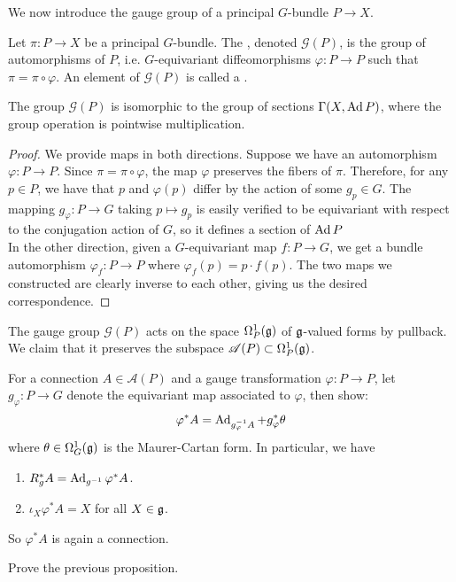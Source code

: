We now introduce the gauge group of a principal $G$-bundle $P \to X$.
%
\begin{defn}
Let $\pi : P \to X$ be a principal $G$-bundle. The , denoted
$\mathscr{G}(P)$, is the group of automorphisms of $P$, i.e. $G$-equivariant
diffeomorphisms $\varphi : P \to P$ such that $\pi = \pi \circ \varphi$.
An element of $\mathscr{G}(P)$ is called a .
\end{defn}
%
\begin{prop}
The group $\mathscr{G}(P)$ is isomorphic to the group of sections
$\Gamma(X,\operatorname{Ad} P)$, where the group operation is pointwise multiplication.
\end{prop}
%
\begin{proof}
We provide maps in both directions. Suppose we have an automorphism
$\varphi : P \to P$. Since $\pi = \pi \circ \varphi$, the map $\varphi$ preserves
the fibers of $\pi$. Therefore, for any $p \in P$, we have that
$p$ and $\varphi(p)$ differ by the action of some $g_p \in G$. The mapping
$g_\varphi : P \to G$ taking $p \mapsto g_p$ is easily verified to be
equivariant with respect to the conjugation action of $G$, so it defines
a section of $\operatorname{Ad} P$ \\

In the other direction, given a $G$-equivariant map
$f : P \to G$, we get a bundle automorphism $\varphi_f : P \to P$
where  $\varphi_f(p) = p \cdot f(p)$. The two maps we constructed are clearly inverse
to each other, giving us the desired correspondence.
\end{proof}
%
The gauge group $\mathscr{G}(P)$ acts on the space $\Omega^1_P(\mathfrak{g})$ of
$\mathfrak{g}$-valued forms by pullback. We claim that it preserves the
subspace $\mathscr{A}(P) \subset \Omega^1_P(\mathfrak{g})$.
%
\begin{prop}
For a connection $A \in \mathscr{A}(P)$ and a gauge transformation
$\varphi : P \to P$, let $g_\varphi : P \to G$ denote the equivariant map
associated to $\varphi$, then show:
\[
\varphi^*A = \operatorname{Ad}_{g^{-1}_\varphi A} + g_\varphi^*\theta
\]
where $\theta \in \Omega^1_G(\mathfrak{g})$ is the Maurer-Cartan form. In particular, we have
\begin{enumerate}
  \item $R_g^*A = \operatorname{Ad}_{g^{-1}}\varphi^*A$.
  \item $\iota_X\varphi^*A = X$ for all $X \in \mathfrak{g}$.
\end{enumerate}
So $\varphi^*A$ is again a connection.
\end{prop}
%
\begin{exer}
Prove the previous proposition.
\end{exer}
